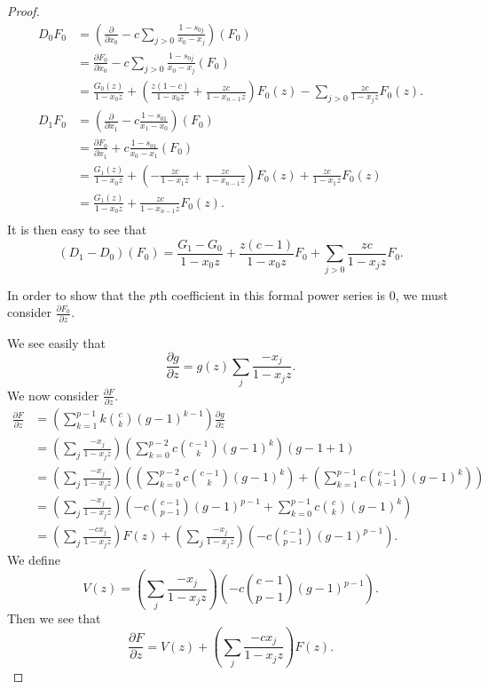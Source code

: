 \documentclass{article}
\numberwithin{equation}{section}
\begin{document}
\begin{proof}
\begin{align*}
D_0F_0&=\left(\frac{\partial}{\partial x_0}-c\sum_{j > 0} \frac{1-s_{0j}}{x_0-x_j}\right)(F_0)\\
&=\frac{\partial F_0}{\partial x_0}-c\sum_{j > 0} \frac{1-s_{0j}}{x_0-x_j}(F_0)\\
&=\frac{G_0(z)}{1-x_0z}+\left(\frac{z(1-c)}{1-x_0z}+\frac{zc}{1-x_{n-1}z}\right)F_0(z)-\sum_{j > 0} \frac{zc}{1-x_jz}F_0(z).\\
D_1F_0&=\left(\frac{\partial}{\partial x_1}-c \frac{1-s_{01}}{x_1-x_0}\right)(F_0)\\
&=\frac{\partial F_0}{\partial x_1}+c \frac{1-s_{01}}{x_0-x_1}(F_0)\\
&=\frac{G_1(z)}{1-x_0z}+\left(-\frac{zc}{1-x_1z}+\frac{zc}{1-x_{n-1}z}\right)F_0(z)+\frac{zc}{1-x_1z}F_0(z)\\
&=\frac{G_1(z)}{1-x_0z}+\frac{zc}{1-x_{n-1}z}F_0(z).\\
\end{align*}
It is then easy to see that $$(D_1-D_0)(F_0)=\frac{G_1-G_0}{1-x_0z}+\frac{z(c-1)}{1-x_0z}F_0+\sum_{j>0} \frac{zc}{1-x_jz}F_0.$$

In order to show that the $p$th coefficient in this formal power series is $0$, we must consider $\frac{\partial F_0}{\partial z}$. 

We see easily that $$\frac{\partial g}{\partial z} = g(z) \sum_j \frac{-x_j}{1-x_jz}.$$ We now consider $\frac{\partial F}{\partial z}$.
\begin{align*}
\frac{\partial F}{\partial z}%
&=\left(\sum_{k=1}^{p-1}k\binom{c}{k}(g-1)^{k-1}\right)\frac{\partial g}{\partial z}\\
&=\left(\sum_j \frac{-x_j}{1-x_jz}\right)\left(\sum_{k=0}^{p-2}c\binom{c-1}{k}(g-1)^{k}\right)(g-1+1)\\
&=\left(\sum_j \frac{-x_j}{1-x_jz}\right)\left(\left(\sum_{k=0}^{p-2}c\binom{c-1}{k}(g-1)^{k}\right)+\left(\sum_{k=1}^{p-1}c\binom{c-1}{k-1}(g-1)^{k}\right)\right)\\
&=\left(\sum_j \frac{-x_j}{1-x_jz}\right)\left(-c\binom{c-1}{p-1}(g-1)^{p-1}+\sum_{k=0}^{p-1}c\binom{c}{k}(g-1)^{k}\right)\\
&=\left(\sum_j \frac{-cx_j}{1-x_jz}\right)F(z)+\left(\sum_j \frac{-x_j}{1-x_jz}\right)\left(-c\binom{c-1}{p-1}(g-1)^{p-1}\right).
\end{align*}
We define $$V(z)=\left(\sum_j \frac{-x_j}{1-x_jz}\right)\left(-c\binom{c-1}{p-1}(g-1)^{p-1}\right).$$ Then we see that $$\frac{\partial F}{\partial z}=V(z)+\left(\sum_j \frac{-cx_j}{1-x_jz}\right)F(z).$$


\end{proof}
\end{document}
